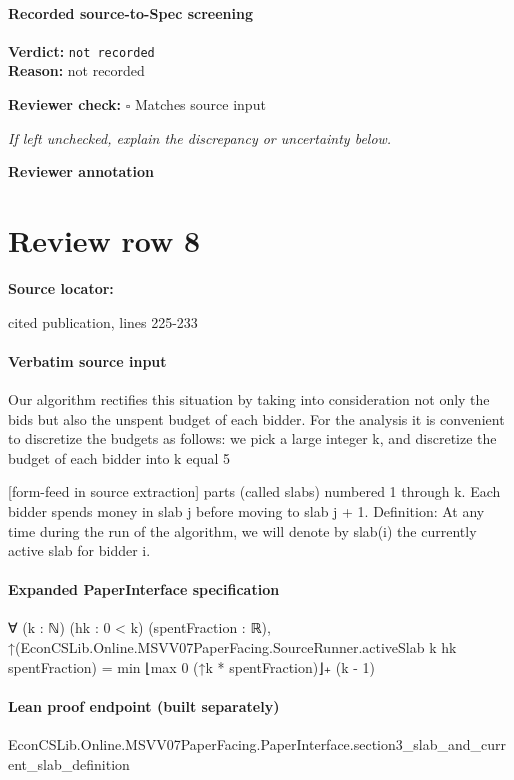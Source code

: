 \documentclass[10pt]{article}
\newcommand{\reviewerbox}{%
  \par\noindent\fbox{\parbox{0.96\linewidth}{\rule{0pt}{0.38in}}}\par
}
\newcommand{\reviewmatch}[1]{%
  \par\noindent\textbf{Reviewer check:} $\square$\; #1\par
  \noindent\emph{If left unchecked, explain the discrepancy or uncertainty below.}\par
}
\begin{document}
\paragraph{Recorded source-to-Spec screening}
\textbf{Verdict:} \texttt{not recorded}
\\
\textbf{Reason:} not recorded
\reviewmatch{Matches source input}
\noindent\textbf{Reviewer annotation}\par
\reviewerbox
\clearpage
\hypertarget{source-claim-61c2a66bd80f6c89}{}
\section*{Review row 8}
\textbf{Source locator:} {\footnotesize\raggedright cited publication, lines 225-\allowbreak{}233\par}
\paragraph{Verbatim source input}
\begin{ReviewVerbatim}
Our algorithm rectifies this situation by taking into consideration not only the bids but also
the unspent budget of each bidder. For the analysis it is convenient to discretize the budgets
as follows: we pick a large integer k, and discretize the budget of each bidder into k equal
5


[form-feed in source extraction]
parts (called slabs) numbered 1 through k. Each bidder spends money in slab j before moving
to slab j + 1.
Definition: At any time during the run of the algorithm, we will denote by slab(i) the
currently active slab for bidder i.
\end{ReviewVerbatim}


\paragraph{Expanded PaperInterface specification}
\begin{ReviewVerbatim}
∀ (k : ℕ) (hk : 0 < k) (spentFraction : ℝ),
  ↑(EconCSLib.Online.MSVV07PaperFacing.SourceRunner.activeSlab k hk spentFraction) =
    min ⌊max 0 (↑k * spentFraction)⌋₊ (k - 1)
\end{ReviewVerbatim}

\paragraph{Lean proof endpoint (built separately)}\begin{ReviewVerbatim}
EconCSLib.Online.MSVV07PaperFacing.PaperInterface.section3_slab_and_current_slab_definition
\end{ReviewVerbatim}
\end{document}
